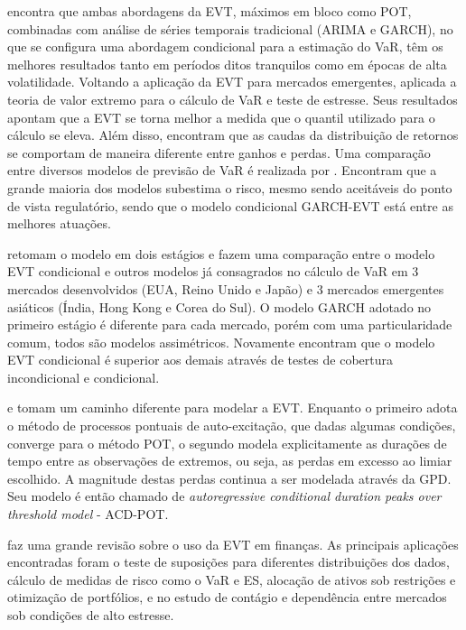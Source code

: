 \documentclass[1p]{elsarticle}
\theoremstyle{definition}
\begin{document}
\cite{Bystroem2004} encontra que ambas abordagens da EVT, máximos em bloco como POT, combinadas com análise de séries temporais tradicional (ARIMA e GARCH), no que se configura uma abordagem condicional para a estimação do VaR, têm os melhores resultados tanto em períodos ditos tranquilos como em épocas de alta volatilidade. Voltando a aplicação da EVT para mercados emergentes, \cite{Gencay2004} aplicada a teoria de valor extremo para o cálculo de VaR e teste de estresse. Seus resultados apontam que a EVT se torna melhor a medida que o quantil utilizado para o cálculo se eleva. Além disso, encontram que as caudas da distribuição de retornos se comportam de maneira diferente entre ganhos e perdas. Uma comparação entre diversos modelos de previsão de VaR é realizada por \cite{Kuester2006}. Encontram que a grande maioria dos modelos subestima o risco, mesmo sendo aceitáveis do ponto de vista regulatório, sendo que o modelo condicional GARCH-EVT está entre as melhores atuações.


\cite{Karmakar2014} retomam o modelo em dois estágios e fazem uma comparação entre o modelo EVT condicional e outros modelos já consagrados no cálculo de VaR em 3 mercados desenvolvidos (EUA, Reino Unido e Japão) e 3 mercados emergentes asiáticos (Índia, Hong Kong e Corea do Sul). O modelo GARCH adotado no primeiro estágio é diferente para cada mercado, porém com uma particularidade comum, todos são modelos assimétricos. Novamente encontram que o modelo EVT condicional é superior aos demais através de testes de cobertura incondicional e condicional.

\cite{Chavez-Demoulin2005} e \cite{Herrera2013} tomam um caminho diferente para modelar a EVT. Enquanto o primeiro adota o método de processos pontuais de auto-excitação, que dadas algumas condições, converge para o método POT, o segundo modela explicitamente as durações de tempo entre as observações de extremos, ou seja, as perdas em excesso ao limiar escolhido. A magnitude destas perdas continua a ser modelada através da GPD. Seu modelo é então chamado de \emph{autoregressive conditional duration peaks over threshold model} - ACD-POT.

\cite{Rocco2014} faz uma grande revisão sobre o uso da EVT em finanças. As principais aplicações encontradas  foram o teste de suposições para diferentes distribuições dos dados, cálculo de medidas de risco como o VaR e ES, alocação de ativos sob restrições e otimização de portfólios, e no estudo de contágio e dependência entre mercados sob condições de alto estresse.
\end{document}
